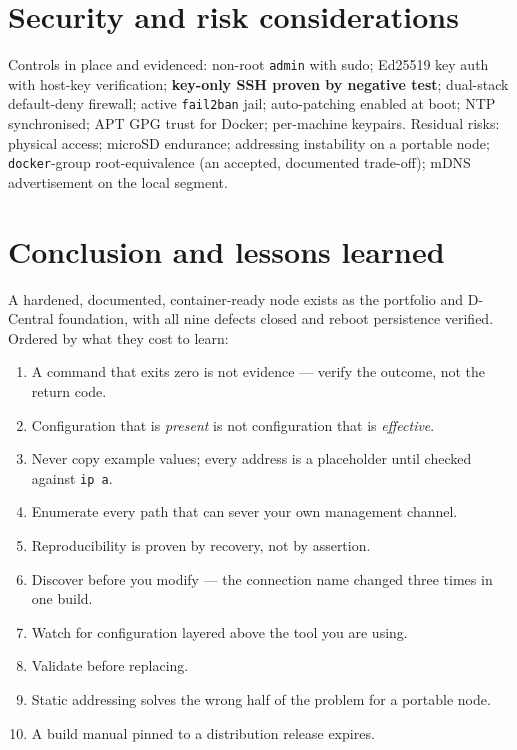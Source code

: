 \documentclass[11pt,a4paper]{article}
\begin{document}
\section{Security and risk considerations}\label{sec:security}
Controls in place and evidenced: non-root \texttt{admin} with sudo; Ed25519 key
auth with host-key verification; \textbf{key-only SSH proven by negative test};
dual-stack default-deny firewall; active \texttt{fail2ban} jail; auto-patching
enabled at boot; NTP synchronised; APT GPG trust for Docker; per-machine keypairs.
Residual risks: physical access; microSD endurance; addressing instability on a
portable node; \texttt{docker}-group root-equivalence (an accepted, documented
trade-off); mDNS advertisement on the local segment.

\section{Conclusion and lessons learned}
A hardened, documented, container-ready node exists as the portfolio and D-Central
foundation, with all nine defects closed and reboot persistence verified. Ordered
by what they cost to learn:
\begin{enumerate}[leftmargin=1.4em]
\item A command that exits zero is not evidence — verify the outcome, not the return code.
\item Configuration that is \emph{present} is not configuration that is \emph{effective}.
\item Never copy example values; every address is a placeholder until checked against \texttt{ip a}.
\item Enumerate every path that can sever your own management channel.
\item Reproducibility is proven by recovery, not by assertion.
\item Discover before you modify — the connection name changed three times in one build.
\item Watch for configuration layered above the tool you are using.
\item Validate before replacing.
\item Static addressing solves the wrong half of the problem for a portable node.
\item A build manual pinned to a distribution release expires.
\end{enumerate}

\end{document}
